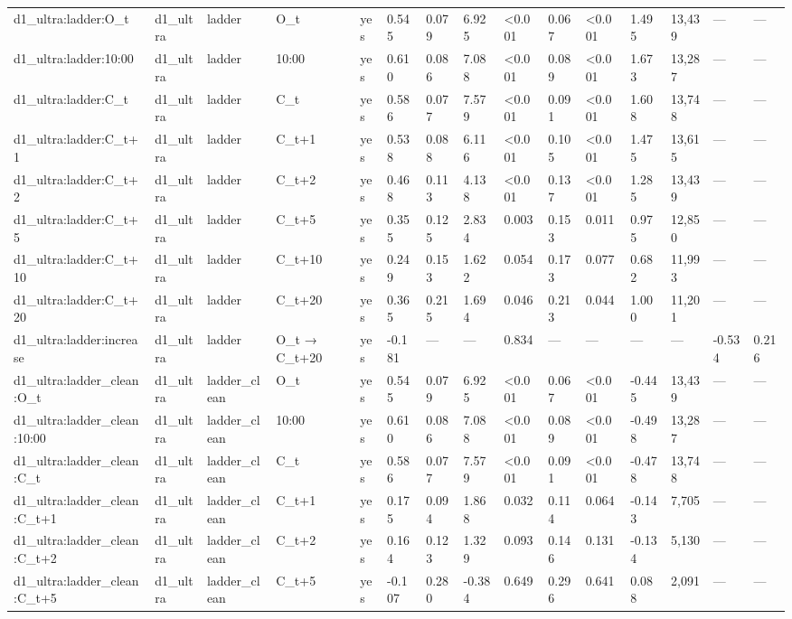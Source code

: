 \begin{tabular}{lllllllllllllll}
d1\_ultra:ladder:O\_t & d1\_ultra & ladder & O\_t & yes & 0.545 & 0.079 & 6.925 & <0.001 & 0.067 & <0.001 & 1.495 & 13,439 & — & — \\
d1\_ultra:ladder:10:00 & d1\_ultra & ladder & 10:00 & yes & 0.610 & 0.086 & 7.088 & <0.001 & 0.089 & <0.001 & 1.673 & 13,287 & — & — \\
d1\_ultra:ladder:C\_t & d1\_ultra & ladder & C\_t & yes & 0.586 & 0.077 & 7.579 & <0.001 & 0.091 & <0.001 & 1.608 & 13,748 & — & — \\
d1\_ultra:ladder:C\_t+1 & d1\_ultra & ladder & C\_t+1 & yes & 0.538 & 0.088 & 6.116 & <0.001 & 0.105 & <0.001 & 1.475 & 13,615 & — & — \\
d1\_ultra:ladder:C\_t+2 & d1\_ultra & ladder & C\_t+2 & yes & 0.468 & 0.113 & 4.138 & <0.001 & 0.137 & <0.001 & 1.285 & 13,439 & — & — \\
d1\_ultra:ladder:C\_t+5 & d1\_ultra & ladder & C\_t+5 & yes & 0.355 & 0.125 & 2.834 & 0.003 & 0.153 & 0.011 & 0.975 & 12,850 & — & — \\
d1\_ultra:ladder:C\_t+10 & d1\_ultra & ladder & C\_t+10 & yes & 0.249 & 0.153 & 1.622 & 0.054 & 0.173 & 0.077 & 0.682 & 11,993 & — & — \\
d1\_ultra:ladder:C\_t+20 & d1\_ultra & ladder & C\_t+20 & yes & 0.365 & 0.215 & 1.694 & 0.046 & 0.213 & 0.044 & 1.000 & 11,201 & — & — \\
d1\_ultra:ladder:increase & d1\_ultra & ladder & O\_t → C\_t+20 & yes & -0.181 & — & — & 0.834 & — & — & — & — & -0.534 & 0.216 \\
d1\_ultra:ladder\_clean:O\_t & d1\_ultra & ladder\_clean & O\_t & yes & 0.545 & 0.079 & 6.925 & <0.001 & 0.067 & <0.001 & -0.445 & 13,439 & — & — \\
d1\_ultra:ladder\_clean:10:00 & d1\_ultra & ladder\_clean & 10:00 & yes & 0.610 & 0.086 & 7.088 & <0.001 & 0.089 & <0.001 & -0.498 & 13,287 & — & — \\
d1\_ultra:ladder\_clean:C\_t & d1\_ultra & ladder\_clean & C\_t & yes & 0.586 & 0.077 & 7.579 & <0.001 & 0.091 & <0.001 & -0.478 & 13,748 & — & — \\
d1\_ultra:ladder\_clean:C\_t+1 & d1\_ultra & ladder\_clean & C\_t+1 & yes & 0.175 & 0.094 & 1.868 & 0.032 & 0.114 & 0.064 & -0.143 & 7,705 & — & — \\
d1\_ultra:ladder\_clean:C\_t+2 & d1\_ultra & ladder\_clean & C\_t+2 & yes & 0.164 & 0.123 & 1.329 & 0.093 & 0.146 & 0.131 & -0.134 & 5,130 & — & — \\
d1\_ultra:ladder\_clean:C\_t+5 & d1\_ultra & ladder\_clean & C\_t+5 & yes & -0.107 & 0.280 & -0.384 & 0.649 & 0.296 & 0.641 & 0.088 & 2,091 & — & — \\

\end{tabular}
